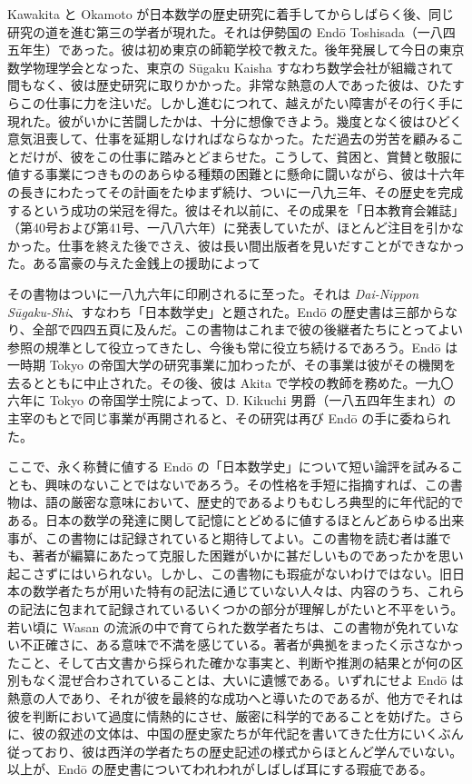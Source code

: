 \documentclass[11pt]{article}
\newcommand{\scanpage}[2]{\clearpage\setcounter{footnote}{0}\noindent{\footnotesize\color{gray}PDF #1 頁 · #2}\par\medskip}
\begin{document}
Kawakita と Okamoto が日本数学の歴史研究に着手してからしばらく後、同じ研究の道を進む第三の学者が現れた。それは伊勢国の Endō Toshisada（一八四五年生）であった。彼は初め東京の師範学校で教えた。後年発展して今日の東京数学物理学会となった、東京の Sūgaku Kaisha すなわち数学会社が組織されて間もなく、彼は歴史研究に取りかかった。非常な熱意の人であった彼は、ひたすらこの仕事に力を注いだ。しかし進むにつれて、越えがたい障害がその行く手に現れた。彼がいかに苦闘したかは、十分に想像できよう。幾度となく彼はひどく意気沮喪して、仕事を延期しなければならなかった。ただ過去の労苦を顧みることだけが、彼をこの仕事に踏みとどまらせた。こうして、貧困と、賞賛と敬服に値する事業につきもののあらゆる種類の困難とに懸命に闘いながら、彼は十六年の長きにわたってその計画をたゆまず続け、ついに一八九三年、その歴史を完成するという成功の栄冠を得た。彼はそれ以前に、その成果を「日本教育会雑誌」（第40号および第41号、一八八六年）に発表していたが、ほとんど注目を引かなかった。仕事を終えた後でさえ、彼は長い間出版者を見いだすことができなかった。ある富豪の与えた金銭上の援助によって

\scanpage{0342}{印刷頁 328}
\noindent その書物はついに一八九六年に印刷されるに至った。それは \emph{Dai-Nippon Sūgaku-Shi}、すなわち「日本数学史」と題された。Endō の歴史書は三部からなり、全部で四四五頁に及んだ。この書物はこれまで彼の後継者たちにとってよい参照の規準として役立ってきたし、今後も常に役立ち続けるであろう。Endō は一時期 Tokyo の帝国大学の研究事業に加わったが、その事業は彼がその機関を去るとともに中止された。その後、彼は Akita で学校の教師を務めた。一九〇六年に Tokyo の帝国学士院によって、D. Kikuchi 男爵（一八五四年生まれ）の主宰のもとで同じ事業が再開されると、その研究は再び Endō の手に委ねられた。

ここで、永く称賛に値する Endō の「日本数学史」について短い論評を試みることも、興味のないことではないであろう。その性格を手短に指摘すれば、この書物は、語の厳密な意味において、歴史的であるよりもむしろ典型的に年代記的である。日本の数学の発達に関して記憶にとどめるに値するほとんどあらゆる出来事が、この書物には記録されていると期待してよい。この書物を読む者は誰でも、著者が編纂にあたって克服した困難がいかに甚だしいものであったかを思い起こさずにはいられない。しかし、この書物にも瑕疵がないわけではない。旧日本の数学者たちが用いた特有の記法に通じていない人々は、内容のうち、これらの記法に包まれて記録されているいくつかの部分が理解しがたいと不平をいう。若い頃に Wasan の流派の中で育てられた数学者たちは、この書物が免れていない不正確さに、ある意味で不満を感じている。著者が典拠をまったく示さなかったこと、そして古文書から採られた確かな事実と、判断や推測の結果とが何の区別もなく混ぜ合わされていることは、大いに遺憾である。いずれにせよ Endō は熱意の人であり、それが彼を最終的な成功へと導いたのであるが、他方でそれは彼を判断において過度に情熱的にさせ、厳密に科学的であることを妨げた。さらに、彼の叙述の文体は、中国の歴史家たちが年代記を書いてきた仕方にいくぶん従っており、彼は西洋の学者たちの歴史記述の様式からほとんど学んでいない。以上が、Endō の歴史書についてわれわれがしばしば耳にする瑕疵である。
\end{document}
